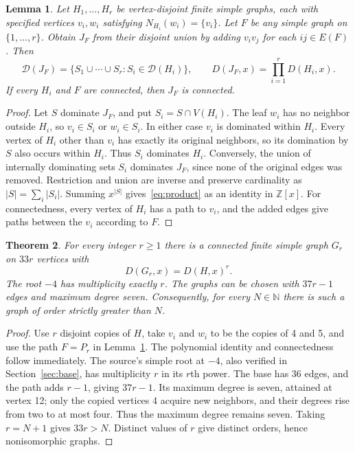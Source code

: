 \documentclass[11pt]{article}
\newtheorem{theorem}{Theorem}
\newtheorem{lemma}[theorem]{Lemma}
\newcommand{\Dom}{\mathcal D}
\newcommand{\base}{H}
\begin{document}
\begin{lemma}\label{lem:join}
Let $H_1,\ldots,H_r$ be vertex-disjoint finite simple graphs, each with
specified vertices $v_i,w_i$ satisfying $N_{H_i}(w_i)=\{v_i\}$.
Let $F$ be any simple graph on $\{1,\ldots,r\}$.
Obtain $J_F$ from their disjoint union by adding $v_iv_j$ for each
$ij\in E(F)$. Then
\begin{equation}\label{eq:product}
 \Dom(J_F)=\{S_1\cup\cdots\cup S_r:S_i\in\Dom(H_i)\},\qquad
 D(J_F,x)=\prod_{i=1}^rD(H_i,x).
\end{equation}
If every $H_i$ and $F$ are connected, then $J_F$ is connected.
\end{lemma}
\begin{proof}
Let $S$ dominate $J_F$, and put $S_i=S\cap V(H_i)$.
The leaf $w_i$ has no neighbor outside $H_i$, so $v_i\in S_i$ or
$w_i\in S_i$. In either case $v_i$ is dominated within $H_i$.
Every vertex of $H_i$ other than $v_i$ has exactly its original
neighbors, so its domination by $S$ also occurs within $H_i$.
Thus $S_i$ dominates $H_i$.
Conversely, the union of internally dominating sets $S_i$ dominates
$J_F$, since none of the original edges was removed.
Restriction and union are inverse and preserve cardinality as
$|S|=\sum_i|S_i|$. Summing $x^{|S|}$ gives~\eqref{eq:product} as an
identity in $\mathbb Z[x]$.
For connectedness, every vertex of $H_i$ has a path to $v_i$, and
the added edges give paths between the $v_i$ according to $F$.
\end{proof}

\begin{theorem}\label{thm:family}
For every integer $r\geq1$ there is a connected finite simple graph
$G_r$ on $33r$ vertices with
\[
 D(G_r,x)=D(\base,x)^r.
\]
The root $-4$ has multiplicity exactly $r$. The graphs can be chosen
with $37r-1$ edges and maximum degree seven.
Consequently, for every $N\in\mathbb N$ there is such a graph of order
strictly greater than $N$.
\end{theorem}
\begin{proof}
Use $r$ disjoint copies of $\base$, take $v_i$ and $w_i$ to be the
copies of 4 and 5, and use the path $F=P_r$ in Lemma~\ref{lem:join}.
The polynomial identity and connectedness follow immediately.
The source's simple root at $-4$, also verified in Section~\ref{sec:base},
has multiplicity $r$ in its $r$th power.
The base has 36 edges, and the path adds $r-1$, giving $37r-1$.
Its maximum degree is seven, attained at vertex 12; only the copied
vertices 4 acquire new neighbors, and their degrees rise from two
to at most four. Thus the maximum degree remains seven.
Taking $r=N+1$ gives $33r>N$.
Distinct values of $r$ give distinct orders, hence nonisomorphic graphs.
\end{proof}
\end{document}
